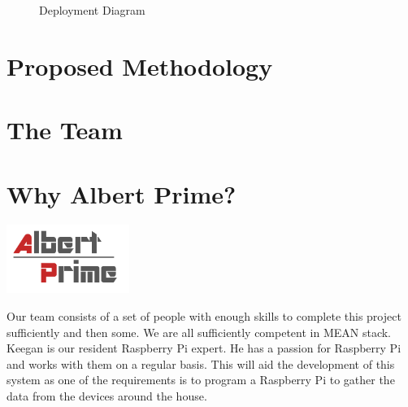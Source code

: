 \documentclass[12pt]{article}
\begin{document}
	\setlength{\fboxsep}{15pt}
	\begin{figure}[htb]
	\caption{Deployment Diagram}
	\end{figure}
	
	

	\newpage
	\section{Proposed Methodology}
	
	\newpage
	\section{The Team}
	
	\newpage
	\section{Why Albert Prime?}
	\begin{center}
    	\includegraphics[width=4cm]{../Common/AlbertPrimeLogo.png}
	\end{center}
	Our team consists of a set of people with enough skills to complete this project sufficiently and then some. We are all sufficiently competent in MEAN stack. \\ 
	
	Keegan is our resident Raspberry Pi expert. He has a passion for Raspberry Pi and works with them on a regular basis. This will aid the development of this system as one of the requirements is to program a Raspberry Pi to gather the data from the devices around the house.\\
	
\end{document}
